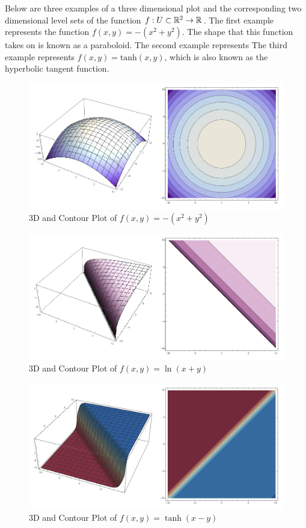 \documentclass[12pt]{article}
\begin{document}
Below are three examples of a three dimensional plot and the corresponding two dimensional level sets of the function $f:U\subset\mathbb{R}^2\rightarrow \mathbb{R}$. The first example represents the function $f(x,y)=-(x^2+y^2)$. The shape that this function takes on is known as a paraboloid. The second example represents  The third example represents $f(x,y)=\mbox{tanh}(x,y)$, which is also known as the hyperbolic tangent function. \\

\begin{figure}[H]
\centering
\caption{3D and Contour Plot of $f(x,y) = -(x^2+y^2)$}
\label{paraboloid_3d}
\indent\includegraphics[scale=0.3]{paraboloid_3d.png}
\end{figure}

\begin{figure}[H]
\centering
\caption{3D and Contour Plot of $f(x,y) = \ln(x+y)$}
\label{logarithmic_3d}
\indent\includegraphics[scale=0.3]{logarithmic_3d.png}
\end{figure}

\begin{figure}[H]
\centering
\caption{3D and Contour Plot of $f(x,y) = \tanh(x-y)$}
\label{hyperbolictangent_3d}
\indent\includegraphics[scale=0.3]{hyperbolictangent_3d.png}
\end{figure}
\end{document}
